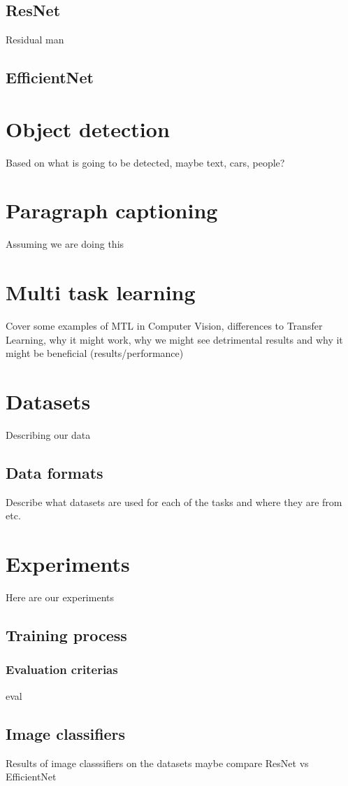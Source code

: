 \section{ResNet}
Residual man 
\section{EfficientNet}





\chapter{Object detection}
Based on what is going to be detected, maybe text, cars, people?
\chapter{Paragraph captioning}
Assuming we are doing this
\chapter{Multi task learning}
Cover some examples of MTL in Computer Vision, differences to Transfer Learning, why it might work, why we might see detrimental results and why it might be beneficial (results/performance)

\chapter{Datasets}
Describing our data
\section{Data formats}
Describe what datasets are used for each of the tasks and where they are from etc.

\chapter{Experiments}
Here are our experiments
\section{Training process}
\subsection{Evaluation criterias}
eval
\section{Image classifiers}
Results of image classsifiers on the datasets maybe compare ResNet vs EfficientNet
